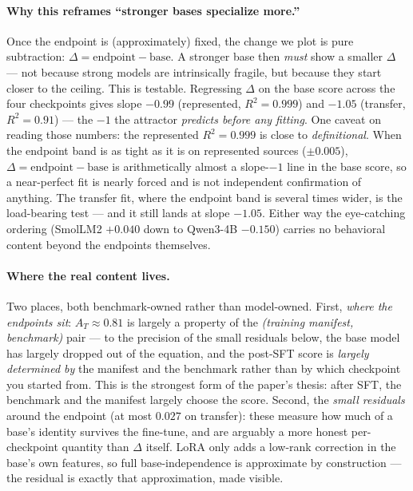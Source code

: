 \paragraph{Why this reframes ``stronger bases specialize more.''} Once the endpoint is (approximately)
fixed, the change we plot is pure subtraction: $\Delta = \text{endpoint} - \text{base}$. A stronger base
then \emph{must} show a smaller $\Delta$ --- not because strong models are intrinsically fragile, but
because they start closer to the ceiling. This is testable. Regressing $\Delta$ on the
base score across the four checkpoints gives slope $-0.99$ (represented, $R^2=0.999$) and $-1.05$ (transfer,
$R^2=0.91$) --- the $-1$ the attractor \emph{predicts before any fitting}. One caveat on reading those
numbers: the represented $R^2=0.999$ is close to \emph{definitional}. When the endpoint band is as tight as
it is on represented sources ($\pm0.005$), $\Delta=\text{endpoint}-\text{base}$ is arithmetically almost a
slope-$-1$ line in the base score, so a near-perfect fit is nearly forced and is not independent
confirmation of anything. The transfer fit, where the endpoint band is several times wider, is the
load-bearing test --- and it still lands at slope $-1.05$. Either way the eye-catching ordering
(SmolLM2 $+0.040$ down to Qwen3-4B $-0.150$) carries no behavioral content beyond the endpoints themselves.

\paragraph{Where the real content lives.} Two places, both benchmark-owned rather than model-owned. First,
\emph{where the endpoints sit}: $A_T\approx0.81$ is largely a property of the \emph{(training manifest,
benchmark)} pair --- to the precision of the small residuals below, the base model has largely dropped out
of the equation, and the post-SFT score is \emph{largely determined by} the manifest and the benchmark
rather than by which checkpoint you started from. This is the strongest form of the paper's thesis:
after SFT, the benchmark and the manifest largely choose the score. Second, the \emph{small residuals} around the
endpoint (at most $0.027$ on transfer): these measure how much of a base's identity survives the fine-tune,
and are arguably a more honest per-checkpoint quantity than $\Delta$ itself. LoRA only adds a low-rank
correction in the base's own features, so full base-independence is approximate by construction --- the
residual is exactly that approximation, made visible.

